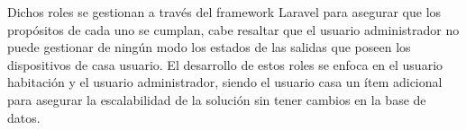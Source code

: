 Dichos roles se gestionan a través del framework Laravel para asegurar que los propósitos de cada uno se cumplan, cabe resaltar que el usuario administrador no puede gestionar de ningún modo los estados de las salidas que poseen los dispositivos de casa usuario. El desarrollo de estos roles se enfoca en el usuario habitación y el usuario administrador, siendo el usuario casa un ítem adicional para asegurar la escalabilidad de la solución sin tener cambios en la base de datos.\\





